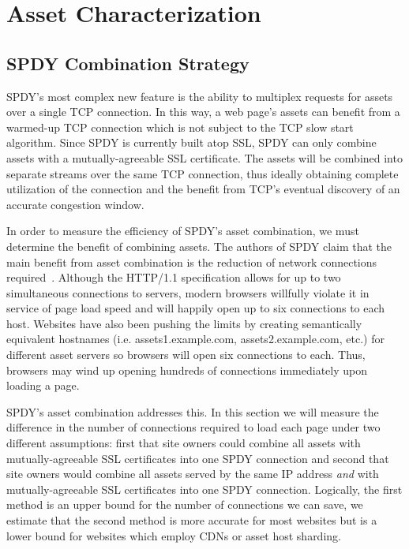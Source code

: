 \documentclass[11pt,letterpaper,notitlepage]{article}
\begin{document}
\section{Asset Characterization}
\label{sec:assets}
\subsection{SPDY Combination Strategy}
SPDY's most complex new feature is the ability to multiplex requests for assets
over a single TCP connection. In this way, a web page's assets can benefit from
a warmed-up TCP connection which is not subject to the TCP slow start
algorithm. Since SPDY is currently built atop SSL, SPDY can only combine assets
with a mutually-agreeable SSL certificate. The assets will be combined into
separate streams over the same TCP connection, thus ideally obtaining complete
utilization of the connection and the benefit from TCP's eventual discovery of
an accurate congestion window.

In order to measure the efficiency of SPDY's asset combination, we must
determine the benefit of combining assets. The authors of SPDY claim that the
main benefit from asset combination is the reduction of network connections
required~\cite{spdy-whitepaper}. Although the HTTP/1.1 specification allows for
up to two simultaneous connections to servers, modern browsers willfully
violate it in service of page load speed and will happily open up to six
connections to each host. Websites have also been pushing the limits by
creating semantically equivalent hostnames (i.e. assets1.example.com,
assets2.example.com, etc.) for different asset servers so browsers will open
six connections to each. Thus, browsers may wind up opening hundreds of
connections immediately upon loading a page.

SPDY's asset combination addresses this. In this section we will measure the
difference in the number of connections required to load each page under two
different assumptions: first that site owners could combine all assets with
mutually-agreeable SSL certificates into one SPDY connection and second that
site owners would combine all assets served by the same IP address \textit{and}
with mutually-agreeable SSL certificates into one SPDY connection. Logically,
the first method is an upper bound for the number of connections we can save,
we estimate that the second method is more accurate for most websites but is a
lower bound for websites which employ CDNs or asset host sharding.
\end{document}
